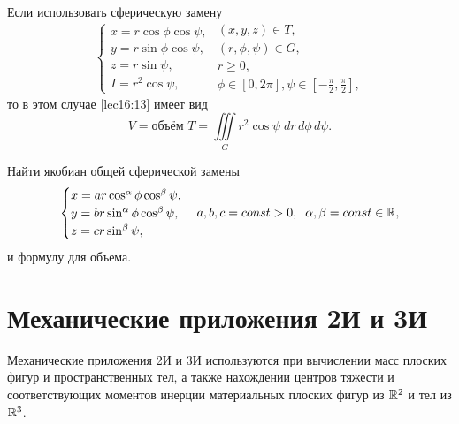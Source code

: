 \documentclass[../../main.tex]{subfiles}
\begin{document}
Если использовать сферическую замену
\begin{equation*}
	\begin{cases}
		x = r \cos \phi \cos \psi,\\
		y = r \sin \phi \cos \psi,\\
		z = r \sin \psi,\\
		I = r^2 \cos \psi, 
	\end{cases}
	\begin{array}{c}
		(x, y, z) \in T, \\
		(r, \phi, \psi) \in G,\\
		r\geq 0,\\
		\phi\in \left[0,2\pi\right],\psi\in\left[-\frac{\pi}2,\frac{\pi}2\right],
	\end{array}
\end{equation*}
то в этом случае \eqref{lec16:13} имеет вид
\begin{equation}
\label{lec16:14}
V = \text{объём } T = \iiint\limits_Gr^2\cos\psi\; dr\, d\phi\, d\psi.
\end{equation}
\begin{exercise}
	Найти якобиан общей сферической замены 
	\begin{equation*}
		\begin{cases}
			x = ar \cos^{\alpha}\phi \cos^{\beta}\psi,\\
			y = br \sin^{\alpha}\phi \cos^{\beta}\psi,\\
			z = cr \sin^{\beta}\psi,
		\end{cases}
		a, b, c =const>0, \;\; \alpha,\beta=const \in \mathbb{R},
	\end{equation*}
и формулу для объема.
\end{exercise}

\section{Механические приложения 2И и 3И}
Механические приложения 2И и 3И используются при вычислении масс плоских фигур 
и пространственных тел, а также нахождении центров
тяжести и соответствующих моментов инерции материальных плоских фигур из 
$\mathbb{R}^2$ и тел из $\mathbb{R}^3$.
\end{document}
